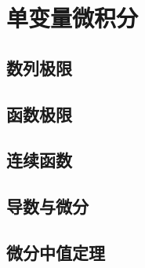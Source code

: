 \part{单变量微积分}

\chapter{数列极限}









\chapter{函数极限}









\chapter{连续函数}







% 
% 

\chapter{导数与微分}\label{chapter:导数}







\chapter{微分中值定理}







